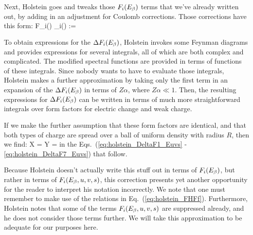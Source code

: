 

Next, Holstein goes and tweaks those $F_i(E_{\beta})$ terms that we've already written out, by adding in an adjustment for Coulomb corrections.  Those corrections have this form:
\beq
	F_i(\Ebeta) \rightarrow {}_i(\Ebeta) := \FF {}
\eeq

To obtain expressions for the $\Delta F_i(E_{\beta})$, Holstein invokes some Feynman diagrams and provides expressions for several integrals, all of which are both complex and complicated.  The modified spectral functions are provided in terms of functions of these integrals.  Since nobody wants to have to evaluate those integrals, Holstein makes a further approximation by taking only the first term in an expansion of the $\Delta F_i(E_{\beta})$ in terms of $Z\alpha$, where $Z\alpha \ll 1$.  Then, the resulting expressions for $\Delta F_i(E_{\beta})$ can be written in terms of much more straightforward integrals over form factors for electric change and weak charge.  

If we make the further assumption that these form factors are identical, and that both types of charge are spread over a ball of uniform density with radius $R$, then we find:
\bea
	X = Y = 
\eea
in the Eqs.~(\ref{eq:holstein_DeltaF1_Euvs} - \ref{eq:holstein_DeltaF7_Euvs}) that follow.

Because Holstein doesn't actually write this stuff out in terms of $F_i(E_{\beta})$, but rather in terms of $F_i(E_{\beta}, u,v,s)$, this correction presents yet another opportunity for the reader to interpret his notation incorrectly.  We note that one must remember to make use of the relations in Eq.~(\ref{eq:holstein_FHFf}).  Furthermore, Holstein notes that some of the terms $F_i(E_{\beta}, u,v,s)$ are suppressed already, and he does not consider those terms further.  We will take this approximation to be adequate for our purposes here.


